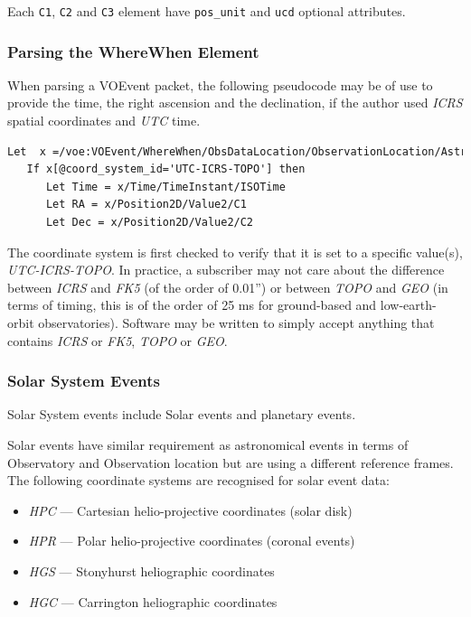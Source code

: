 \documentclass[11pt,a4paper]{ivoa}
\begin{document}
Each {\tt C1}, {\tt C2} and {\tt C3} element have {\tt pos\_unit} and {\tt ucd}
optional attributes. 

\subsubsection{Parsing the WhereWhen Element}
\label{sec:3.4.3}
When parsing a VOEvent packet, the following pseudocode may be of use to provide
the time, the right ascension and the declination, if the author used 
\emph{ICRS} spatial coordinates and \emph{UTC} time. 
\begin{lstlisting}[language=XML]
Let  x =/voe:VOEvent/WhereWhen/ObsDataLocation/ObservationLocation/AstroCoords
   If x[@coord_system_id='UTC-ICRS-TOPO'] then
      Let Time = x/Time/TimeInstant/ISOTime
      Let RA = x/Position2D/Value2/C1
      Let Dec = x/Position2D/Value2/C2 
\end{lstlisting}

The coordinate system is first checked to verify that it is set to a specific 
value(s), \emph{UTC-ICRS-TOPO}. In practice, a subscriber may not care about the
difference between \emph{ICRS} and \emph{FK5} (of the order of 0.01'') or 
between \emph{TOPO} and \emph{GEO} (in terms of timing, this is of the order of
25 ms for ground-based and low-earth-orbit observatories). Software may be 
written to simply accept anything that contains \emph{ICRS} or \emph{FK5},
\emph{TOPO} or \emph{GEO}. 


\subsubsection{Solar System Events}
\label{sec:3.4.4}
Solar System events include Solar events and planetary events. 

Solar events have similar requirement as astronomical events in terms of 
Observatory and Observation location but are using a different reference frames.
The following coordinate systems are recognised for solar event data: 
\begin{itemize}
\item \emph{HPC} --- Cartesian helio-projective coordinates (solar disk)
\item \emph{HPR} --- Polar helio-projective coordinates (coronal events)
\item \emph{HGS} --- Stonyhurst heliographic coordinates
\item \emph{HGC} --- Carrington heliographic coordinates
\end{itemize}
\end{document}

